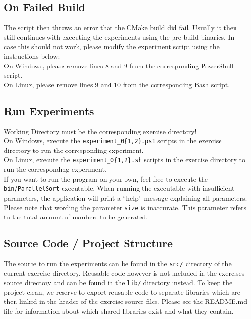 \documentclass[twocolumn]{article}
\begin{document}
\subsection{On Failed Build}
The script then throws an error that the CMake build did fail.
Usually it then still continues with executing the experiments using the pre-build binaries.
In case this should not work, please modify the experiment script using the instructions below:\\
On Windows, please remove lines $8$ and $9$ from the corresponding PowerShell script.\\
On Linux, please remove lines $9$ and $10$ from the corresponding Bash script.

\subsection{Run Experiments}
Working Directory must be the corresponding exercise directory!\\
On Windows, execute the \texttt{experiment\_0\{1,2\}.ps1} scripts in the exercise directory to run the corresponding experiment.\\
On Linux, execute the \texttt{experiment\_0\{1,2\}.sh} scripts in the exercise directory to run the corresponding experiment.\\
If you want to run the program on your own, feel free to execute the \texttt{bin/ParallelSort} executable. 
When running the executable with insufficient parameters, the application will print a ``help'' message explaining all parameters. 
Please note that wording the parameter \texttt{size} is inaccurate. This parameter refers to the total amount of numbers to be generated. 

\subsection{Source Code / Project Structure}
The source to run the experiments can be found in the \texttt{src/} directory of the current exercise directory. 
Reusable code however is not included in the exercises source directory and can be found in the \texttt{lib/} directory instead. 
To keep the project clean, we reserve to export reusable code to separate libraries which are then linked in the header of the exercise source files. 
Please see the README.md file for information about which shared libraries exist and what they contain.
\end{document}
